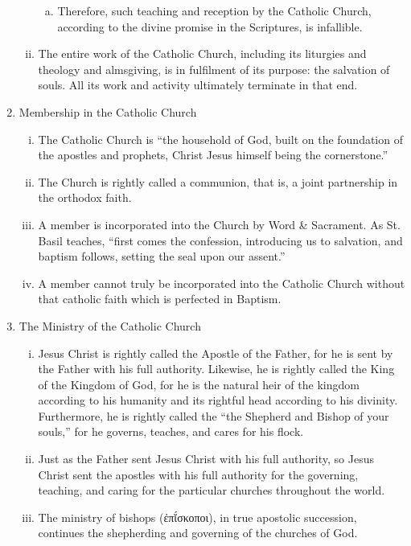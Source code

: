 \begin{enumerate}
\begin{enumerate}[i.]
\begin{enumerate}[a.]
			\item Therefore, such teaching and reception by the Catholic Church, according to the divine promise in the Scriptures, is infallible.
		\end{enumerate}
		\item The entire work of the Catholic Church, including its liturgies and theology and almsgiving, is in fulfilment of its purpose: the salvation of souls. All its work and activity ultimately terminate in that end.
	\end{enumerate}
	\item Membership in the Catholic Church
	\begin{enumerate}[i.]
		\item The Catholic Church is ``the household of God, built on the foundation of the apostles and prophets, Christ Jesus himself being the cornerstone.''
		\item The Church is rightly called a communion, that is, a joint partnership in the orthodox faith.
		\item A member is incorporated into the Church by Word \& Sacrament. As St. Basil teaches, ``first comes the confession, introducing us to salvation, and baptism follows, setting the seal upon our assent.''
		\item A member cannot truly be incorporated into the Catholic Church without that catholic faith which is perfected in Baptism.
	\end{enumerate}
	\item The Ministry of the Catholic Church
	\begin{enumerate}[i.]
		\item Jesus Christ is rightly called the Apostle of the Father, for he is sent by the Father with his full authority. Likewise, he is rightly called the King of the Kingdom of God, for he is the natural heir of the kingdom according to his humanity and its rightful head according to his divinity. Furthermore, he is rightly called the ``the Shepherd and Bishop of your souls,'' for he governs, teaches, and cares for his flock.
		\item Just as the Father sent Jesus Christ with his full authority, so Jesus Christ sent the apostles with his full authority for the governing, teaching, and caring for the particular churches throughout the world.
		\item The ministry of bishops (ἐπῐ́σκοποι), in true apostolic succession, continues the shepherding and governing of the churches of God.

\end{enumerate}
\end{enumerate}
